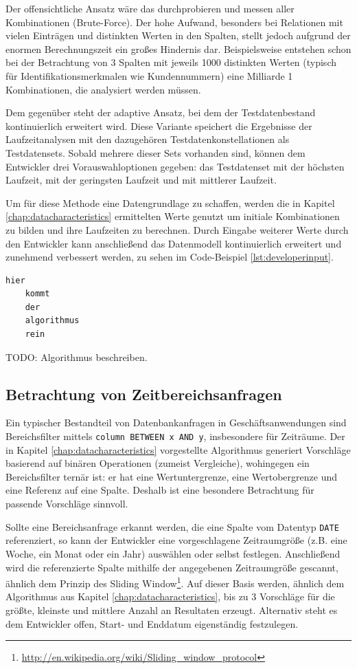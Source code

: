 Der offensichtliche Ansatz wäre das durchprobieren und messen aller Kombinationen (Brute-Force).
Der hohe Aufwand, besonders bei Relationen mit vielen Einträgen und distinkten Werten in den Spalten, stellt jedoch aufgrund der enormen Berechnungszeit ein großes Hindernis dar.
Beispielsweise entstehen schon bei der Betrachtung von 3 Spalten mit jeweils 1000 distinkten Werten (typisch für Identifikationsmerkmalen wie Kundennummern) eine Milliarde 1 Kombinationen, die analysiert werden müssen.

Dem gegenüber steht der adaptive Ansatz, bei dem der Testdatenbestand kontinuierlich erweitert wird.
Diese Variante speichert die Ergebnisse der Laufzeitanalysen mit den dazugehören Testdatenkonstellationen als Testdatensets.
Sobald mehrere dieser Sets vorhanden sind, können dem Entwickler drei Vorauswahloptionen gegeben: das Testdatenset mit der höchsten Laufzeit, mit der geringsten Laufzeit und mit mittlerer Laufzeit.

Um für diese Methode eine Datengrundlage zu schaffen, werden die in Kapitel \ref{chap:datacharacteristics} ermittelten Werte genutzt um initiale Kombinationen zu bilden und ihre Laufzeiten zu berechnen.
Durch Eingabe weiterer Werte durch den Entwickler kann anschließend das Datenmodell kontinuierlich erweitert und zunehmend verbessert werden, zu sehen im Code-Beispiel \ref{lst:developerinput}.

\begin{lstlisting}[caption={Eingaben von Testwertkonstellationen erweitern gegebenenfalls das Datenmodell}, label={lst:developerinput}, language=Python]
	hier
	kommt
	der
	algorithmus
	rein
\end{lstlisting}

TODO: Algorithmus beschreiben.

\subsection{Betrachtung von Zeitbereichsanfragen}
Ein typischer Bestandteil von Datenbankanfragen in Geschäftsanwendungen sind Bereichsfilter mittels \texttt{column BETWEEN x AND y},  insbesondere für Zeiträume.
Der in Kapitel \ref{chap:datacharacteristics} vorgestellte Algorithmus generiert Vorschläge basierend auf binären Operationen (zumeist Vergleiche), wohingegen ein Bereichsfilter ternär ist: er hat eine Wertuntergrenze, eine Wertobergrenze und eine Referenz auf eine Spalte.
Deshalb ist eine besondere Betrachtung für passende Vorschläge sinnvoll.

Sollte eine Bereichsanfrage erkannt werden, die eine Spalte vom Datentyp \texttt{DATE} referenziert, so kann der Entwickler eine vorgeschlagene Zeitraumgröße (z.B. eine Woche, ein Monat oder ein Jahr) auswählen oder selbst festlegen.
Anschließend wird die referenzierte Spalte mithilfe der angegebenen Zeitraumgröße gescannt, ähnlich dem Prinzip des Sliding Window\footnote{\url{http://en.wikipedia.org/wiki/Sliding_window_protocol}}.
Auf dieser Basis werden, ähnlich dem Algorithmus aus Kapitel \ref{chap:datacharacteristics}, bis zu 3 Vorschläge für die größte, kleinste und mittlere Anzahl an Resultaten erzeugt.
Alternativ steht es dem Entwickler offen, Start- und Enddatum eigenständig festzulegen.

